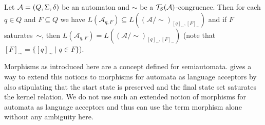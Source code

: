\begin{corollary}
\label{prelim:cor:acceptor-congruence}
  Let $\mathcal A = (Q, \Sigma, \delta)$
  be an automaton and $\sim$ be a $\mathcal T_S(\mathcal A)$-congruence.
  Then for each $q \in Q$ and $F \subseteq Q$
  we have $L(\mathcal A_{q,F}) \subseteq L(( \mathcal A / {\sim} )_{[q]_{\sim}, [F]_{\sim}})$
  and if $F$ saturates~$\sim$, then
  $L(\mathcal A_{q,F}) = L(( \mathcal A / {\sim} )_{[q]_{\sim}, [F]_{\sim}})$ (note that $[F]_{\sim} = \{ [q]_{\sim} \mid q \in F\}$).  
\end{corollary}

Morphisms as introduced here are a concept defined for semiautomata. 
gives a way to extend this notions to morphisms for automata as language acceptors
by also stipulating that the start state is preserved
and the final state set saturates the kernel relation. We do not use such an extended notion of morphisms
for automata as language acceptors and thus can use the term morphism alone without any ambiguity here.